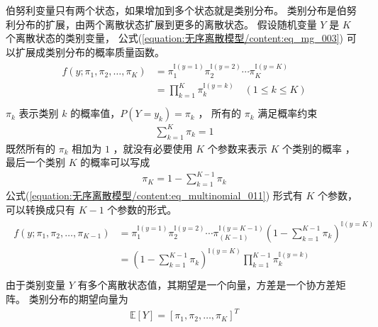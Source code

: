 \documentclass[letterpaper,10pt,english]{sphinxmanual}
\begin{document}
伯努利变量只有两个状态，如果增加到多个状态就是类别分布。
类别分布是伯努利分布的扩展，由两个离散状态扩展到更多的离散状态。
假设随机变量 \(Y\) 是 \(K\) 个离散状态的类别变量，
公式(\ref{equation:无序离散模型/content:eq_mg_003}) 可以扩展成类别分布的概率质量函数。
\begin{align}\label{equation:无序离散模型/content:eq_multinomial_011}\!\begin{aligned}
f(y;\pi_1,\pi_2,\dots,\pi_K) &= \pi_1^{\mathbb{I}(y=1)}
\pi_2^{\mathbb{I}(y=2)}
\cdots
\pi_K^{\mathbb{I}(y=K)}\\
&= \prod_{k=1}^{K} \pi_k^{\mathbb{I}(y=k)} \quad  ( 1 \le k \le K)\\
\end{aligned}\end{align}
\(\pi_k\) 表示类别 \(k\) 的概率值，\(P(Y=y_k)=\pi_k\) ，
所有的 \(\pi_k\) 满足概率约束
\begin{equation}\label{equation:无序离散模型/content:eq_multinomial_012}
\begin{split}\sum_{k=1}^K \pi_k = 1\end{split}
\end{equation}
既然所有的 \(\pi_k\) 相加为 \(1\)
，就没有必要使用 \(K\) 个参数来表示 \(K\) 个类别的概率
，最后一个类别 \(K\) 的概率可以写成
\begin{equation}\label{equation:无序离散模型/content:无序离散模型/content:3}
\begin{split}\pi_K = 1 - \sum_{k=1}^{K-1} \pi_k\end{split}
\end{equation}
公式(\ref{equation:无序离散模型/content:eq_multinomial_011}) 形式有 \(K\) 个参数，可以转换成只有 \(K-1\)
个参数的形式。
\begin{align}\label{equation:无序离散模型/content:eq_multinomial_013}\!\begin{aligned}
f(y;\pi_1,\pi_2,\dots,\pi_{K-1}) &= \pi_1^{\mathbb{I}(y=1)}
\pi_2^{\mathbb{I}(y=2)}
\cdots
\pi_{(K-1)}^{\mathbb{I}(y=K-1)}
(1 - \sum_{k=1}^{K-1} \pi_k)^{\mathbb{I}(y=K)}\\
&= (1 - \sum_{k=1}^{K-1} \pi_k)^{\mathbb{I}(y=K)} \prod_{k=1}^{K-1} \pi_k^{\mathbb{I}(y=k)}\\
\end{aligned}\end{align}
由于类别变量 \(Y\) 有多个离散状态值，其期望是一个向量，方差是一个协方差矩阵。
类别分布的期望向量为
\begin{equation}\label{equation:无序离散模型/content:无序离散模型/content:4}
\begin{split}\mathbb{E}[Y] = [\pi_1,\pi_2,\dots,\pi_K]^T\end{split}
\end{equation}
\end{document}
